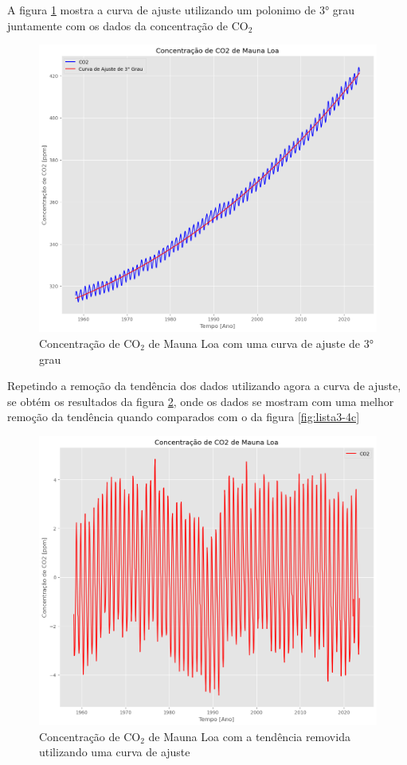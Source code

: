 \documentclass[12pt,a4paper,portuguese]{article}
\begin{document}
A figura \ref{fig:lista3-4d} mostra a curva de ajuste utilizando um polonimo de 3° grau juntamente com os dados da concentração de CO$_2$
\begin{figure}[H]
	\centering
	\includegraphics[width=1\linewidth]{lista3-4d}
	\caption{Concentração de  CO$_2$ de Mauna Loa com uma curva de ajuste de 3° grau}
	\label{fig:lista3-4d}
\end{figure}

Repetindo a remoção da tendência dos dados utilizando agora a curva de ajuste, se obtém os resultados da figura \ref{fig:lista3-4e}, onde os dados se mostram com uma melhor remoção da tendência quando comparados com o da figura \ref{fig:lista3-4c}

\begin{figure}[H]
	\centering
	\includegraphics[width=1\linewidth]{lista3-4e}
	\caption{Concentração de  CO$_2$ de Mauna Loa com a tendência removida utilizando uma curva de ajuste}
	\label{fig:lista3-4e}
\end{figure}
\end{document}
